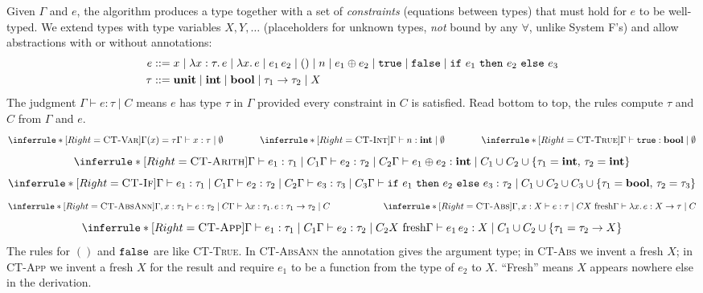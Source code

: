 Given $\Gamma$ and $e$, the algorithm produces a type together with a set of
\emph{constraints} (equations between types) that must hold for $e$ to be
well-typed. We extend types with type variables $X, Y, \ldots$ (placeholders for
unknown types, \emph{not} bound by any $\forall$, unlike System F's) and allow
abstractions with or without annotations:
\begin{align*}
e &::= x \mid \lambda x : \tau.\, e \mid \lambda x.\, e \mid e_1\, e_2 \mid () \mid n \mid e_1 \oplus e_2
      \mid \ttkw{true} \mid \ttkw{false} \mid \ttkw{if}\ e_1\ \ttkw{then}\ e_2\ \ttkw{else}\ e_3 \\
\tau &::= \kw{unit} \mid \kw{int} \mid \kw{bool} \mid \tau_1 \to \tau_2 \mid X
\end{align*}
The judgment $\Gamma \vdash e : \tau \mid C$ means $e$ has type $\tau$ in $\Gamma$
provided every constraint in $C$ is satisfied. Read bottom to top, the rules compute
$\tau$ and $C$ from $\Gamma$ and $e$.
\[
\inferrule*[Right=\textsc{CT-Var}]
  {\Gamma(x) = \tau}
  {\Gamma \vdash x : \tau \mid \emptyset}
\qquad \qquad
\inferrule*[Right=\textsc{CT-Int}]
  { }
  {\Gamma \vdash n : \kw{int} \mid \emptyset}
\qquad \qquad
\inferrule*[Right=\textsc{CT-True}]
  { }
  {\Gamma \vdash \ttkw{true} : \kw{bool} \mid \emptyset}
\]
\[
\inferrule*[Right=\textsc{CT-Arith}]
  {\Gamma \vdash e_1 : \tau_1 \mid C_1 \\ \Gamma \vdash e_2 : \tau_2 \mid C_2}
  {\Gamma \vdash e_1 \oplus e_2 : \kw{int} \mid C_1 \cup C_2 \cup \{\tau_1 = \kw{int},\, \tau_2 = \kw{int}\}}
\]
\[
\inferrule*[Right=\textsc{CT-If}]
  {\Gamma \vdash e_1 : \tau_1 \mid C_1 \\ \Gamma \vdash e_2 : \tau_2 \mid C_2 \\ \Gamma \vdash e_3 : \tau_3 \mid C_3}
  {\Gamma \vdash \ttkw{if}\ e_1\ \ttkw{then}\ e_2\ \ttkw{else}\ e_3 : \tau_2 \mid C_1 \cup C_2 \cup C_3 \cup \{\tau_1 = \kw{bool},\, \tau_2 = \tau_3\}}
\]
\[
\inferrule*[Right=\textsc{CT-AbsAnn}]
  {\Gamma, x : \tau_1 \vdash e : \tau_2 \mid C}
  {\Gamma \vdash \lambda x : \tau_1.\, e : \tau_1 \to \tau_2 \mid C}
\qquad \qquad \qquad
\inferrule*[Right=\textsc{CT-Abs}]
  {\Gamma, x : X \vdash e : \tau \mid C \\ X \text{ fresh}}
  {\Gamma \vdash \lambda x.\, e : X \to \tau \mid C}
\]
\[
\inferrule*[Right=\textsc{CT-App}]
  {\Gamma \vdash e_1 : \tau_1 \mid C_1 \\ \Gamma \vdash e_2 : \tau_2 \mid C_2 \\ X \text{ fresh}}
  {\Gamma \vdash e_1\, e_2 : X \mid C_1 \cup C_2 \cup \{\tau_1 = \tau_2 \to X\}}
\]
The rules for $()$ and $\mathtt{false}$ are like \textsc{CT-True}. In
\textsc{CT-AbsAnn} the annotation gives the argument type; in \textsc{CT-Abs} we
invent a fresh $X$; in \textsc{CT-App} we invent a fresh $X$ for the result and
require $e_1$ to be a function from the type of $e_2$ to $X$. ``Fresh'' means $X$
appears nowhere else in the derivation.

